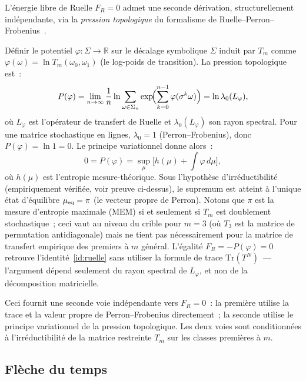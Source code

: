 \documentclass[12pt,a4paper]{article}
\begin{document}
\begin{remarque}[Voie par la pression topologique~: seconde preuve de $F_R = 0$]
\label{rem:ruelle_pressure}
L'énergie libre de Ruelle $F_R = 0$ admet une seconde dérivation,
structurellement indépendante, via la \emph{pression topologique} du
formalisme de Ruelle--Perron--Frobenius~\cite{Ruelle1978}.

Définir le potentiel $\varphi : \Sigma \to \mathbb{R}$ sur le décalage
symbolique $\Sigma$ induit par $T_m$ comme
$\varphi(\omega) = \ln T_m(\omega_0, \omega_1)$ (le log-poids de
transition). La pression topologique est~:
\[
  P(\varphi) = \lim_{n \to \infty} \frac{1}{n}
    \ln \sum_{\omega \in \Sigma_n} \exp\!\Bigl(\sum_{k=0}^{n-1}\varphi(\sigma^k\omega)\Bigr)
  = \ln \lambda_0(L_\varphi),
\]
où $L_\varphi$ est l'opérateur de transfert de Ruelle et
$\lambda_0(L_\varphi)$ son rayon spectral. Pour une matrice
stochastique en lignes, $\lambda_0 = 1$ (Perron--Frobenius), donc
$P(\varphi) = \ln 1 = 0$. Le principe variationnel donne alors~:
\[
  0 = P(\varphi) = \sup_\mu \bigl[h(\mu) + \int \varphi\,d\mu\bigr],
\]
où $h(\mu)$ est l'entropie mesure-théorique. Sous l'hypothèse
d'irréductibilité (empiriquement vérifiée, voir preuve ci-dessus),
le supremum est atteint à l'unique état d'équilibre
$\mu_{\rm eq} = \pi$ (le vecteur propre de Perron).
Notons que $\pi$ est la mesure d'entropie maximale (MEM) si et
seulement si $T_m$ est doublement stochastique~; ceci vaut au niveau
du crible pour $m = 3$ (où $T_3$ est la matrice de permutation
antidiagonale) mais ne tient pas nécessairement pour la matrice de
transfert empirique des premiers à $m$ général.
L'égalité $F_R = -P(\varphi) = 0$ retrouve l'identité~\ref{id:ruelle}
sans utiliser la formule de trace $\mathrm{Tr}(T^N)$~--- l'argument
dépend seulement du rayon spectral de $L_\varphi$, et non de la
décomposition matricielle.

Ceci fournit une seconde voie indépendante vers $F_R = 0$~: la
première utilise la trace et la valeur propre de Perron--Frobenius
directement~; la seconde utilise le principe variationnel de la
pression topologique. Les deux voies sont conditionnées à
l'irréductibilité de la matrice restreinte $T_m$ sur les classes
premières à $m$.
\end{remarque}

\subsection{Flèche du temps}
\label{sec:arrow}
\end{document}

